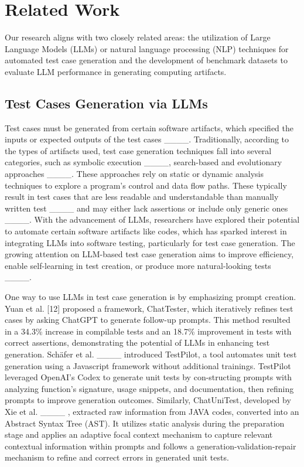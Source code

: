 \section{Related Work}
Our research aligns with two closely related areas: the utilization of Large Language Models (LLMs) or natural language processing (NLP) techniques for automated test case generation and the development of benchmark datasets to evaluate LLM performance in generating computing artifacts. 

\subsection{Test Cases Generation via LLMs}
Test cases must be generated from certain software artifacts, which specified the inputs or expected outputs of the test cases ____. Traditionally, according to the types of artifacts used, test case generation techniques fall into several categories, such as symbolic execution ____, search-based and evolutionary approaches ____. These approaches rely on static or dynamic analysis techniques to explore a program’s control and data flow paths. These typically result in test cases that are less readable and understandable than manually written test ____ and may either lack assertions or include only generic ones ____. With the advancement of LLMs, researchers have explored their potential to automate certain software artifacts like codes, which has sparked interest in integrating LLMs into software testing, particularly for test case generation. The growing attention on LLM-based test case generation aims to improve efficiency, enable self-learning in test creation, or produce more natural-looking tests ____. 

One way to use LLMs in test case generation is by emphasizing prompt creation. Yuan et al. [12] proposed a framework, ChatTester, which iteratively refines test cases by asking ChatGPT to generate follow-up prompts. This method resulted in a 34.3\% increase in compilable tests and an 18.7\% improvement in tests with correct assertions, demonstrating the potential of LLMs in enhancing test generation. Schäfer et al. ____ introduced TestPilot, a tool automates unit test generation using a Javascript framework without additional trainings. TestPilot leveraged OpenAI's Codex to generate unit tests by con-structing prompts with analyzing function's signature, usage snippets, and documentation, then refining prompts to improve generation outcomes. Similarly, ChatUniTest, developed by Xie et al. ____ , extracted raw information from JAVA codes, converted into an Abstract Syntax Tree (AST). It utilizes static analysis during the preparation stage and applies an adaptive focal context mechanism to capture relevant contextual information within prompts and follows a generation-validation-repair mechanism to refine and correct errors in generated unit tests.

